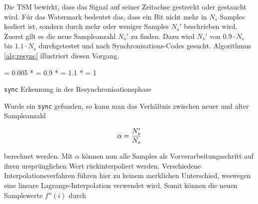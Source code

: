 Die TSM bewirkt, dass das Signal auf seiner Zeitachse gestreckt oder gestaucht wird. Für das Watermark bedeutet das, dass ein Bit nicht mehr in $N_s$ Samples kodiert ist, sondern durch mehr oder weniger Samples ${N}_{s}'$ beschrieben wird. 
Zuerst gilt es die neue Sampleanzahl ${N}_{s}'$ zu finden. Dazu wird ${N}_{s}'$ von $0.9 \cdot {N}_{s}$ bis $1.1 \cdot {N}_{s}$ durchgetestet und nach Synchronisations-Codes gesucht. Algorithmus \ref{alg:resync} illustriert diesen Vorgang.

\begin{algorithm}[h]



\BlankLine

\Steplen = 0.005 * \Ns\;
\Lowerbound = 0.9 * \Ns\;
\Upperbound = 1.1 * \Ns\;
\Cursor = 1\;

\caption{\texttt{sync} Erkennung in der Resynchronisationsphase}
\label{alg:resync}
\end{algorithm}


Wurde ein \texttt{sync} gefunden, so kann man das Verhältnis zwischen neuer und alter Sampleanzahl

	\begin{equation}
		\alpha = { {N}_{s}' \over {N}_{s} }
		\label{equ:resampling_factor}
	\end{equation}

berechnet werden. Mit $\alpha$ können nun alle Samples als Vorverarbeitungsschritt auf ihren ursprünglichen Wert rückinterpoliert werden. Verschiedene Interpolationsverfahren führen hier zu keinem merklichen Unterschied\cite{xiang2007robust}, weswegen eine lineare Lagrange-Interpolation verwendet wird. Somit können die neuen Samplewerte $f''(i)$ durch

